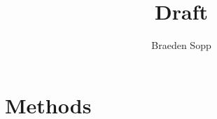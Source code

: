 \documentclass[11pt]{article}
\title{Draft}
\author{Braeden Sopp}
\date{}
\begin{document}
    \maketitle

    
%    

    \section*{Methods}
    




    
    
\end{document}
